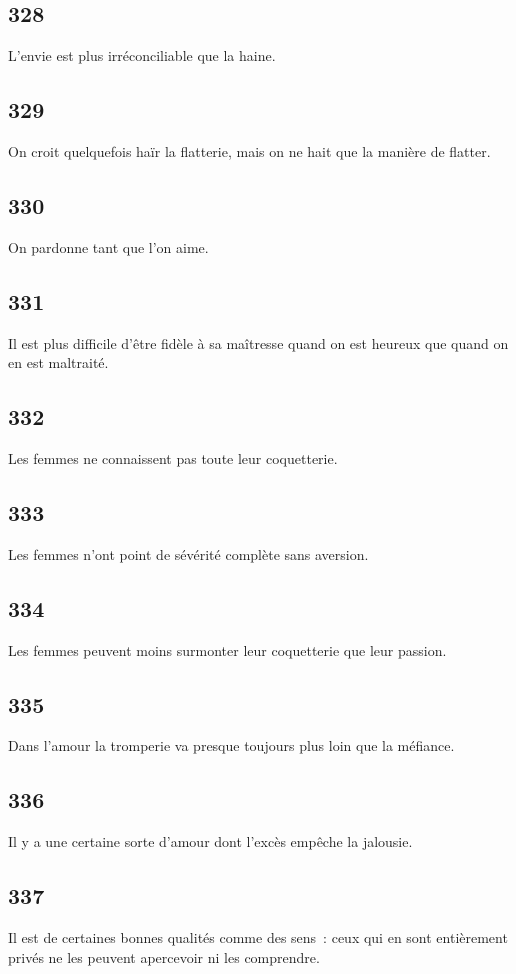 \documentclass[french,twoside]{book} %
\begin{document}
\subsection[{328}]{ \textsc{328} }
\noindent L’envie est plus irréconciliable que la haine.
\subsection[{329}]{ \textsc{329} }
\noindent On croit quelquefois haïr la flatterie, mais on ne hait que la manière de flatter.
\subsection[{330}]{ \textsc{330} }
\noindent On pardonne tant que l’on aime.
\subsection[{331}]{ \textsc{331} }
\noindent Il est plus difficile d’être fidèle à sa maîtresse quand on est heureux que quand on en est maltraité.
\subsection[{332}]{ \textsc{332} }
\noindent Les femmes ne connaissent pas toute leur coquetterie.
\subsection[{333}]{ \textsc{333} }
\noindent Les femmes n’ont point de sévérité complète sans aversion.
\subsection[{334}]{ \textsc{334} }
\noindent Les femmes peuvent moins surmonter leur coquetterie que leur passion.
\subsection[{335}]{ \textsc{335} }
\noindent Dans l’amour la tromperie va presque toujours plus loin que la méfiance.
\subsection[{336}]{ \textsc{336} }
\noindent Il y a une certaine sorte d’amour dont l’excès empêche la jalousie.
\subsection[{337}]{ \textsc{337} }
\noindent Il est de certaines bonnes qualités comme des sens : ceux qui en sont entièrement privés ne les peuvent apercevoir ni les comprendre.
\end{document}
